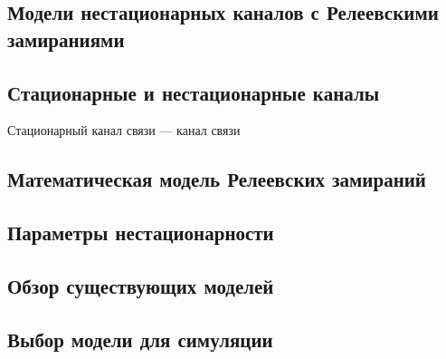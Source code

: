 \begin{center}
	\section{Модели нестационарных каналов с Релеевскими замираниями}
	\subsection{Стационарные и нестационарные каналы}
\end{center}


Стационарный канал связи --- канал связи  


\begin{center}
	\subsection{Математическая модель Релеевских замираний}
\end{center}

\begin{center}
	\subsection{Параметры нестационарности}
\end{center}

\begin{center}
	\subsection{Обзор существующих моделей}
\end{center}

\begin{center}
	\subsection{Выбор модели для симуляции}
\end{center}
